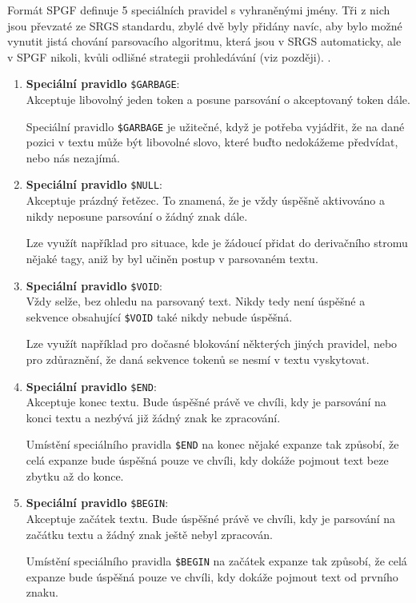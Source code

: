 
Formát SPGF definuje 5 speciálních pravidel s vyhraněnými jmény.
Tři z nich jsou převzaté ze SRGS standardu, zbylé dvě byly přidány navíc, aby bylo možné vynutit jistá chování parsovacího algoritmu,
která jsou v SRGS automaticky, ale v SPGF nikoli, kvůli odlišné strategii prohledávání (viz později).
.
\begin{enumerate}
	\item \textbf{Speciální pravidlo} \texttt{\$GARBAGE}:\\
	      Akceptuje libovolný jeden token a posune parsování o akceptovaný token dále.

	      Speciální pravidlo \texttt{\$GARBAGE} je užitečné, když je potřeba vyjádřit, že na dané pozici v textu
	      může být libovolné slovo, které buďto nedokážeme předvídat, nebo nás nezajímá.
	\item \textbf{Speciální pravidlo} \texttt{\$NULL}:\\
	      Akceptuje prázdný řetězec.
	      To znamená, že je vždy úspěšně aktivováno a nikdy neposune parsování o žádný znak dále.

	      Lze využít například pro situace, kde je žádoucí přidat do derivačního stromu nějaké tagy,
	      aniž by byl učiněn postup v parsovaném textu.
	\item \textbf{Speciální pravidlo} \texttt{\$VOID}:\\
	      Vždy selže, bez ohledu na parsovaný text.
	      Nikdy tedy není úspěšné a sekvence obsahující \texttt{\$VOID} také nikdy nebude úspěšná.

	      Lze využít například pro dočasné blokování některých jiných pravidel, nebo pro zdůraznění,
	      že daná sekvence tokenů se nesmí v textu vyskytovat.
	\item \textbf{Speciální pravidlo} \texttt{\$END}:\\
	      Akceptuje konec textu.
	      Bude úspěšné právě ve chvíli, kdy je parsování na konci textu a nezbývá již žádný znak ke zpracování.

	      Umístění speciálního pravidla \texttt{\$END} na konec nějaké expanze tak způsobí,
	      že celá expanze bude úspěšná pouze ve chvíli, kdy dokáže pojmout text beze zbytku až do konce.
	\item \textbf{Speciální pravidlo} \texttt{\$BEGIN}: \\
	      Akceptuje začátek textu.
	      Bude úspěšné právě ve chvíli, kdy je parsování na začátku textu a žádný znak ještě nebyl zpracován.

	      Umístění speciálního pravidla \texttt{\$BEGIN} na začátek expanze tak způsobí,
	      že celá expanze bude úspěšná pouze ve chvíli, kdy dokáže pojmout text od prvního znaku.
\end{enumerate}

